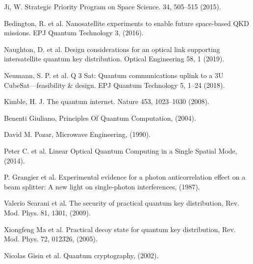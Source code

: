 \begin{thebibliography}{99}
  Ji,
  W. Strategic Priority Program on Space Science. 34,
  505–515 (2015).

  Bedington,
  R. et al. Nanosatellite experiments to enable future space-based QKD missions. EPJ Quantum Technology 3,
  (2016).

  Naughton,
  D. et al. Design considerations for an optical link supporting intersatellite quantum key distribution. Optical Engineering 58,
  1 (2019).

  Neumann,
  S. P. et al. Q 3 Sat: Quantum communications uplink to a 3U CubeSat—feasibility \& design. EPJ Quantum Technology 5,
  1–24 (2018).

  Kimble,
  H. J. The quantum internet. Nature 453,
  1023–1030 (2008).

  Benenti Giuliano,
  Principles Of Quantum Computation,
  (2004).

  David M. Pozar,
  Microwave Engineering,
  (1990).

  Peter C. et al.
  Linear Optical Quantum Computing in a Single Spatial Mode,
  (2014).

  P. Grangier et al.
  Experimental evidence for a photon anticorrelation effect on a beam splitter: A new light on single-photon interferences,
  (1987).

  Valerio Scarani et al.
  The security of practical quantum key distribution,
  Rev. Mod. Phys. 81, 1301,
  (2009).

  Xiongfeng Ma et al.
  Practical decoy state for quantum key distribution,
  Rev. Mod. Phys. 72, 012326,
  (2005).

  Nicolas Gisin et al.
  Quantum cryptography,
  (2002).

\end{thebibliography}
